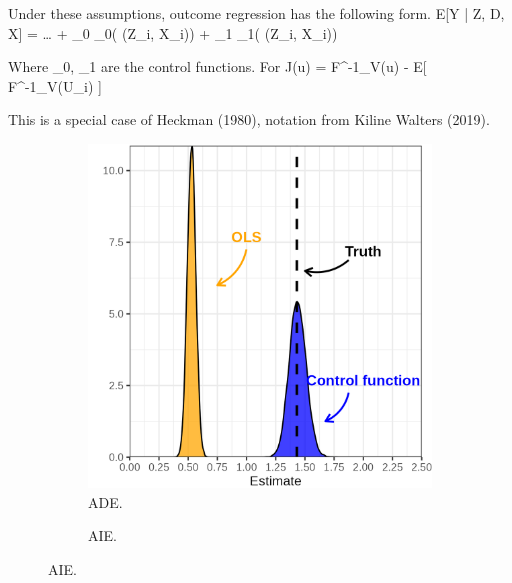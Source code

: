 Under these assumptions, outcome regression has the following form.
E[Y | Z, D, X] = … + \rho_0 \lamda_0( \pi(Z_i, X_i)) + \rho_1 \lamda_1( \pi(Z_i, X_i))

Where \lambda_0, \lambda_1 are the control functions. For J(u) = F^-1_V(u) - E[ F^-1_V(U_i) ]

This is a special case of Heckman (1980), notation from Kiline Walters (2019).

\begin{figure}[h!]
    \caption{Simulated Distribution of CM Effect Estimates.}
    \begin{subfigure}[c]{0.475\textwidth}
        \centering
        \caption{ADE.}
        \includegraphics[width=\textwidth]{
            ../programs/simulations/sim-output/heckit-direct-dist.png}
    \end{subfigure}
    \begin{subfigure}[c]{0.475\textwidth}
        \centering
        \caption{AIE.}

\end{subfigure}
\end{figure}

